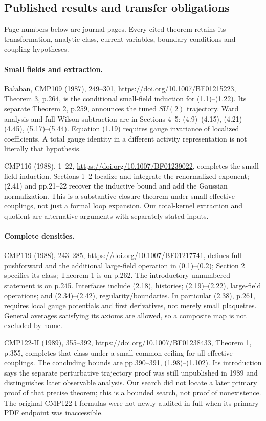 \documentclass[11pt]{article}
\theoremstyle{remark}
\begin{document}
\subsection{Published results and transfer obligations}
\label{hrb-published}

Page numbers below are journal pages. Every cited theorem
retains its transformation, analytic class, current
variables, boundary conditions and coupling hypotheses.

\paragraph{Small fields and extraction.}
Ba{\l}aban, CMP109 (1987), 249--301,
\url{https://doi.org/10.1007/BF01215223},
Theorem 3, p.264, is the conditional small-field induction
for (1.1)--(1.22). Its separate Theorem 2, p.259,
announces the tuned \(SU(2)\) trajectory. Ward analysis
and full Wilson subtraction are in Sections 4--5:
(4.9)--(4.15), (4.21)--(4.45), (5.17)--(5.44).
Equation (1.19) requires gauge invariance of localized
coefficients. A total gauge identity in a different
activity representation is not literally that hypothesis.

CMP116 (1988), 1--22,
\url{https://doi.org/10.1007/BF01239022},
completes the small-field induction. Sections 1--2
localize and integrate the renormalized exponent;
(2.41) and pp.21--22 recover the inductive bound
and add the Gaussian normalization. This is a
substantive closure theorem under small effective
couplings, not just a formal loop expansion.
Our total-kernel extraction and quotient are
alternative arguments with separately stated inputs.

\paragraph{Complete densities.}
CMP119 (1988), 243--285,
\url{https://doi.org/10.1007/BF01217741},
defines full pushforward and the additional large-field
operation in (0.1)--(0.2); Section 2 specifies its
class; Theorem 1 is on p.262. The introductory
unnumbered statement is on p.245. Interfaces include
(2.18), histories; (2.19)--(2.22), large-field
operations; and (2.34)--(2.42), regularity/boundaries.
In particular (2.38), p.261, requires local gauge
potentials and first derivatives, not merely small
plaquettes. General averages satisfying its axioms
are allowed, so a composite map is not excluded by name.

CMP122-II (1989), 355--392,
\url{https://doi.org/10.1007/BF01238433},
Theorem 1, p.355, completes that class under a small
common ceiling for all effective couplings.
The concluding bounds are pp.390--391, (1.98)--(1.102).
Its introduction says the separate perturbative
trajectory proof was still unpublished in 1989 and
distinguishes later observable analysis.
Our search did not locate a later primary proof
of that precise theorem; this is a bounded search,
not proof of nonexistence. The original CMP122-I
formulas were not newly audited in full when its
primary PDF endpoint was inaccessible.
\end{document}
